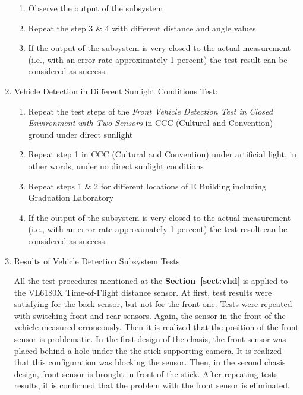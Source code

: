 \documentclass[a4paper,12pt]{article}
\begin{document}
\begin{enumerate}
\begin{enumerate}
		\item Observe the output of the subsystem  
		
		\item Repeat the step 3 \& 4 with different distance and angle values  
		
		\item If the output of the subsystem is very closed to the actual measurement (i.e., with an error rate approximately 1 percent) the test result can be considered as success. 
		
	\end{enumerate}
	
	
	\item Vehicle Detection in Different Sunlight Conditions Test:
	
	\begin{enumerate}
		
		\item Repeat the test steps of the \textit{Front Vehicle Detection Test in Closed Environment with Two Sensors}  in CCC (Cultural and Convention) ground under direct sunlight  
		
		\item Repeat step 1 in CCC (Cultural and Convention) under artificial light, in other words, under no direct sunlight conditions  
		
		\item Repeat steps 1 \& 2 for different locations of E Building including Graduation Laboratory  
		
		\item If the output of the subsystem is very closed to the actual measurement (i.e., with an error rate approximately 1 percent) the test result can be considered as success. 
		
	\end{enumerate}
	
	
	
	
	
	\item{Results of Vehicle Detection Subsystem Tests}
	
	
	All the test procedures mentioned at the \textbf{Section~\ref{sect:vhd}} is applied to the VL6180X Time-of-Flight distance sensor. At first, test results were satisfying for the back sensor, but not for the front one. Tests were repeated with switching front and rear sensors. Again, the sensor in the front of the vehicle measured erroneously. Then it is realized that the position of the front sensor is problematic. In the first design of the chasis, the front sensor was placed behind a hole under the the stick supporting camera. It is realized that this configuration was blocking the sensor. Then, in the second chasis design, front sensor is brought in front of the stick. After repeating tests results, it is confirmed that the problem with the front sensor is eliminated. 
	

\end{enumerate}
\end{document}
